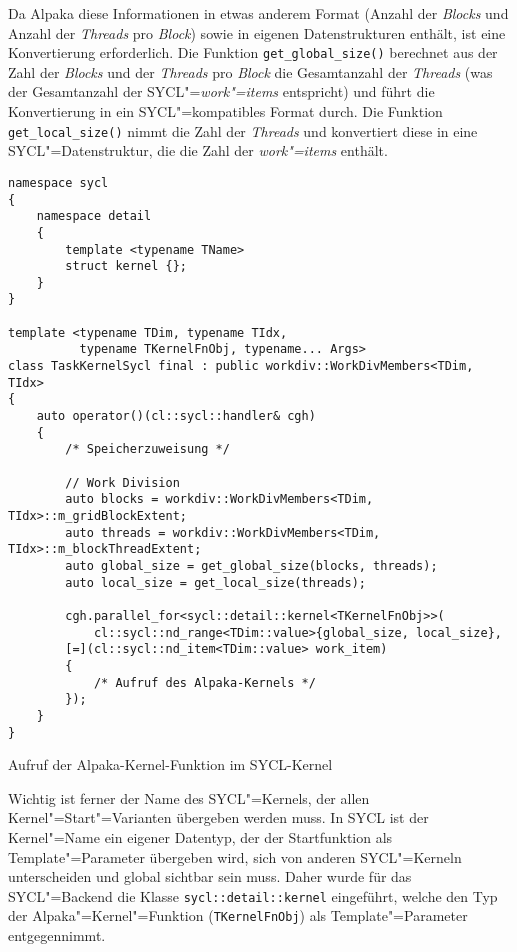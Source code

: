 Da Alpaka diese Informationen in etwas anderem Format (Anzahl der
\textit{Blocks} und Anzahl der \textit{Threads} pro \textit{Block}) sowie in
eigenen Datenstrukturen enthält, ist eine Konvertierung erforderlich. Die
Funktion \texttt{get\_global\_size()} berechnet aus der Zahl der \textit{Blocks}
und der \textit{Threads} pro \textit{Block} die Gesamtanzahl der
\textit{Threads} (was der Gesamtanzahl der SYCL"=\textit{work"=items}
entspricht) und führt die Konvertierung in ein SYCL"=kompatibles Format durch.
Die Funktion \texttt{get\_local\_size()} nimmt die Zahl der \textit{Threads} und
konvertiert diese in eine SYCL"=Datenstruktur, die die Zahl der
\textit{work"=items} enthält.

\begin{code}
    \begin{verbatim}
namespace sycl
{
    namespace detail
    {
        template <typename TName>
        struct kernel {};
    }
}

template <typename TDim, typename TIdx,
          typename TKernelFnObj, typename... Args>
class TaskKernelSycl final : public workdiv::WorkDivMembers<TDim, TIdx>
{
    auto operator()(cl::sycl::handler& cgh)
    {
        /* Speicherzuweisung */

        // Work Division
        auto blocks = workdiv::WorkDivMembers<TDim, TIdx>::m_gridBlockExtent;
        auto threads = workdiv::WorkDivMembers<TDim, TIdx>::m_blockThreadExtent;
        auto global_size = get_global_size(blocks, threads);
        auto local_size = get_local_size(threads);

        cgh.parallel_for<sycl::detail::kernel<TKernelFnObj>>(
            cl::sycl::nd_range<TDim::value>{global_size, local_size},
        [=](cl::sycl::nd_item<TDim::value> work_item)
        {
            /* Aufruf des Alpaka-Kernels */
        });
    }
}
    \end{verbatim}
    \caption{Aufruf der Alpaka-Kernel-Funktion im SYCL-Kernel}
    \label{implementierung:task:kernel:launch:src}
\end{code}
\vspace{3mm}
Wichtig ist ferner der Name des SYCL"=Kernels, der allen
Kernel"=Start"=Varianten übergeben werden muss. In SYCL ist der Kernel"=Name ein
eigener Datentyp, der der Startfunktion als Template"=Parameter übergeben wird,
sich von anderen SYCL"=Kerneln unterscheiden und global sichtbar sein muss.
Daher wurde für das SYCL"=Backend die Klasse \texttt{sycl::detail::kernel}
eingeführt, welche den Typ der Alpaka"=Kernel"=Funktion (\texttt{TKernelFnObj})
als Template"=Parameter entgegennimmt.

